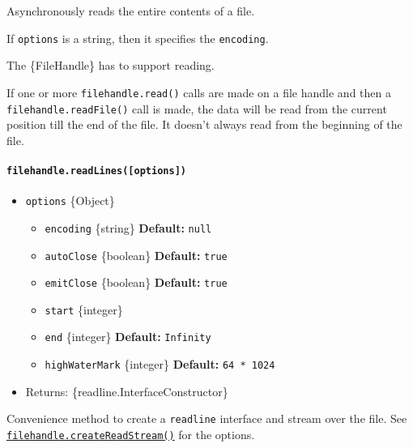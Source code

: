 Asynchronously reads the entire contents of a file.

If \texttt{options} is a string, then it specifies the
\texttt{encoding}.

The \{FileHandle\} has to support reading.

If one or more \texttt{filehandle.read()} calls are made on a file
handle and then a \texttt{filehandle.readFile()} call is made, the data
will be read from the current position till the end of the file. It
doesn't always read from the beginning of the file.

\paragraph{\texorpdfstring{\texttt{filehandle.readLines({[}options{]})}}{filehandle.readLines({[}options{]})}}\label{filehandle.readlinesoptions}

\begin{itemize}
\tightlist
\item
  \texttt{options} \{Object\}

  \begin{itemize}
  \tightlist
  \item
    \texttt{encoding} \{string\} \textbf{Default:} \texttt{null}
  \item
    \texttt{autoClose} \{boolean\} \textbf{Default:} \texttt{true}
  \item
    \texttt{emitClose} \{boolean\} \textbf{Default:} \texttt{true}
  \item
    \texttt{start} \{integer\}
  \item
    \texttt{end} \{integer\} \textbf{Default:} \texttt{Infinity}
  \item
    \texttt{highWaterMark} \{integer\} \textbf{Default:}
    \texttt{64\ *\ 1024}
  \end{itemize}
\item
  Returns: \{readline.InterfaceConstructor\}
\end{itemize}

Convenience method to create a \texttt{readline} interface and stream
over the file. See
\hyperref[filehandlecreatereadstreamoptions]{\texttt{filehandle.createReadStream()}}
for the options.

\begin{Shaded}
\begin{Highlighting}[]
 \OperatorTok{;}

\OperatorTok{=}  \NormalTok{(}\NormalTok{)}\OperatorTok{;}

 \NormalTok{ (}\NormalTok{()) \{}
  \OperatorTok{;}
\NormalTok{\}}
\end{Highlighting}
\end{Shaded}

